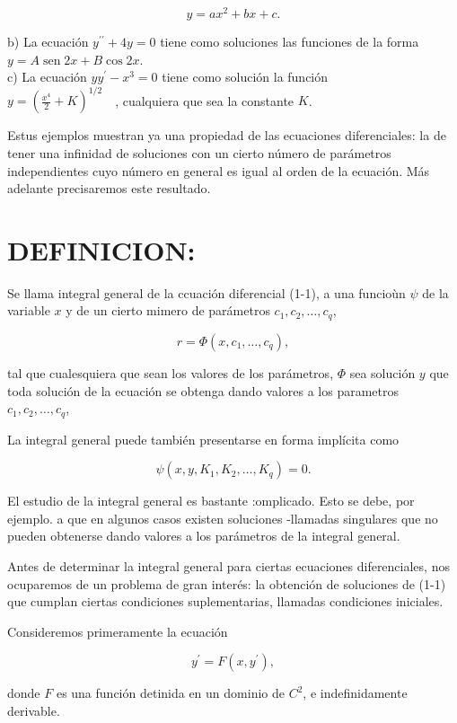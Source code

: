 \documentclass[10pt]{article}
\theoremstyle{plain}
\theoremstyle{definition}
\theoremstyle{remark}
\begin{document}
$$
y=a x^{2}+b x+c .
$$

b) La ecuación $y^{\prime \prime}+4 y=0$ tiene como soluciones las funciones de la forma $y=A \operatorname{sen} 2 x+B \cos 2 x$.\\
c) La ecuación $y y^{\prime}-x^{3}=0$ tiene como solución la función\\
$y=\left(\frac{x^{4}}{2}+K\right)^{1 / 2} \quad$, cualquiera que sea la constante $K$.


Estus ejemplos muestran ya una propiedad de las ecuaciones diferenciales: la de tener una infinidad de soluciones con un cierto número de parámetros independientes cuyo número en general es igual al orden de la ecuación. Más adelante precisaremos este resultado.

\section*{DEFINICION:}
Se llama integral general de la ccuación diferencial (1-1), a una funcioùn $\psi$ de la variable $x$ y de un cierto mimero de parámetros $c_{1}, c_{2}, \ldots, c_{q}$,

$$
r=\Phi\left(x, c_{1}, \ldots, c_{q}\right),
$$

tal que cualesquiera que sean los valores de los parámetros, $\Phi$ sea solución $y$ que toda solución de la ecuación se obtenga dando valores a los parametros $c_{1}, c_{2}, \ldots, c_{q}$,

La integral general puede también presentarse en forma implícita como

$$
\psi\left(x, y, K_{1}, K_{2}, \ldots, K_{q}\right)=0 .
$$

El estudio de la integral general es bastante :omplicado. Esto se debe, por ejemplo. a que en algunos casos existen soluciones -llamadas singulares que no pueden obtenerse dando valores a los parámetros de la integral general.

Antes de determinar la integral general para ciertas ecuaciones diferenciales, nos ocuparemos de un problema de gran interés: la obtención de soluciones de (1-1) que cumplan ciertas condiciones suplementarias, llamadas condiciones iniciales.

Consideremos primeramente la ecuación


\begin{equation*}
y^{\prime}=F\left(x, y^{\prime}\right), \tag{1-2}
\end{equation*}


donde $F$ es una función detinida en un dominio de $C^{2}$, e indefinidamente derivable.
\end{document}
